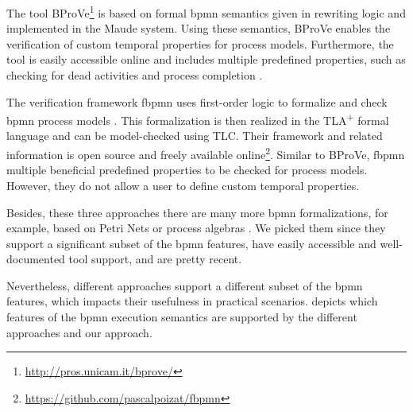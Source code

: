 \documentclass[adraft, copyright, creativecommons]{eptcs} %
\begin{document}
The tool BProVe\footnote{\url{http://pros.unicam.it/bprove/}} is based on formal \gls*{bpmn} semantics given in rewriting logic and implemented in the Maude system.
Using these semantics, BProVe enables the verification of custom temporal properties for process models.
Furthermore, the tool is easily accessible online and includes multiple predefined properties, such as checking for dead activities and process completion \cite{corradiniBProVeToolSupport2017, corradiniFormalApproachAnalysis2021}.

The verification framework \textsf{fbpmn} uses first-order logic to formalize and check \gls*{bpmn} process models \cite{houhouFirstOrderLogicSemantics2019, houhouFirstOrderLogicVerification2022}.
This formalization is then realized in the TLA\textsuperscript{+} formal language and can be model-checked using TLC.
Their framework and related information is open source and freely available online\footnote{\url{https://github.com/pascalpoizat/fbpmn}}.
Similar to BProVe, \textsf{fbpmn} multiple beneficial predefined properties to be checked for process models.
However, they do not allow a user to define custom temporal properties.

Besides, these three approaches there are many more \gls*{bpmn} formalizations, for example, based on Petri Nets \cite{dijkmanSemanticsAnalysisBusiness2008} or process algebras \cite{wongProcessSemanticsBPMN2008}.
We picked them since they support a significant subset of the \gls*{bpmn} features, have easily accessible and well-documented tool support, and are pretty recent.

Nevertheless, different approaches support a different subset of the \gls*{bpmn} features, which impacts their usefulness in practical scenarios.
 depicts which features of the \gls*{bpmn} execution semantics are supported by the different approaches and our approach.
\end{document}
